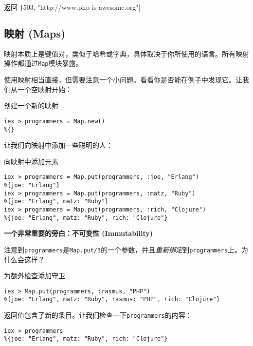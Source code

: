 返回 \texttt|{503, "http://www.php-is-awesome.org"}|

\subsection{映射 (Maps)}

映射本质上是键值对，类似于哈希或字典，具体取决于你所使用的语言。所有映射操作都通过\texttt{Map}模块暴露。

使用映射相当直接，但需要注意一个小问题。看看你是否能在例子中发现它。让我们从一个空映射开始：

\begin{code}{创建一个新的映射}
\begin{verbatim}
iex > programmers = Map.new()
%{}
\end{verbatim}
\label{lst:create_a_new_map}
\end{code}

让我们向映射中添加一些聪明的人：

\begin{code}{向映射中添加元素}
\begin{verbatim}
iex > programmers = Map.put(programmers, :joe, "Erlang")
%{joe: "Erlang"}
iex > programmers = Map.put(programmers, :matz, "Ruby")
%{joe: "Erlang", matz: "Ruby"}
iex > programmers = Map.put(programmers, :rich, "Clojure")
%{joe: "Erlang", matz: "Ruby", rich: "Clojure"}
\end{verbatim}
\label{lst:add_elements_to_a_map}
\end{code}

\textbf{一个非常重要的旁白：不可变性 (Immutability)}

注意到\texttt{programmers}是\texttt{Map.put/3}的一个参数，并且\emph{重新绑定}到\texttt{programmers}上。为什么会这样？

\begin{code}{为额外检查添加守卫}
\begin{verbatim}
iex > Map.put(programmers, :rasmus, "PHP")
%{joe: "Erlang", matz: "Ruby", rasmus: "PHP", rich: "Clojure"}
\end{verbatim}
\label{lst:adding_guards_for_extra_checks}
\end{code}

返回值包含了新的条目。让我们检查一下\texttt{programmers}的内容：

\begin{code}{}\begin{verbatim}
iex > programmers
%{joe: "Erlang", matz: "Ruby", rich: "Clojure"}
\end{verbatim}
\end{code}

